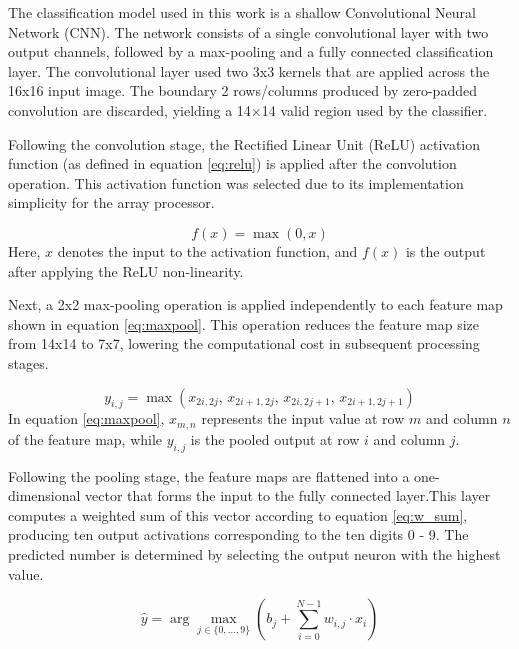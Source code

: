         The classification model used in this work is a shallow Convolutional Neural Network (CNN). The network consists of a single convolutional layer with two output channels, followed by a max-pooling and a fully connected classification layer. The convolutional layer used two 3x3 kernels that are applied across the 16x16 input image. The boundary 2 rows/columns produced by zero-padded convolution are discarded, yielding a 14×14 valid region used by the classifier.
        
        Following the convolution stage, the Rectified Linear Unit (ReLU) activation function (as defined in equation \ref{eq:relu}) is applied after the convolution operation. This activation function was selected due to its implementation simplicity for the array processor.
        
        \begin{equation}
        f(x) = \max(0,x)
        \label{eq:relu}
        \end{equation}
        Here, $x$ denotes the input to the activation function, and $f(x)$ is the output after applying the ReLU non-linearity.
        
        Next, a 2x2 max-pooling operation is applied independently to each feature map shown in equation \ref{eq:maxpool}. This operation reduces the feature map size from 14x14 to 7x7, lowering the computational cost in subsequent processing stages.

        \begin{equation}
        y_{i,j} = \max \left(
        x_{2i,2j},\,
        x_{2i+1,2j},\,
        x_{2i,2j+1},\,
        x_{2i+1,2j+1}
        \right)
        \label{eq:maxpool}
        \end{equation}
        In equation \ref{eq:maxpool}, $x_{m,n}$ represents the input value at row $m$ and column $n$ of the feature map, while $y_{i,j}$ is the pooled output at row $i$ and column $j$.
        
        Following the pooling stage, the feature maps are flattened into a one-dimensional vector that forms the input to the fully connected layer.This layer computes a weighted sum of this vector according to equation \ref{eq:w_sum}, producing ten output activations corresponding to the ten digits 0 - 9. The predicted number is determined by selecting the output neuron with the highest value.

        \begin{equation}
          \hat{y} = \arg\max_{j \in \{0,\ldots,9\}} \left( b_j + \sum_{i=0}^{N-1} w_{i,j} \cdot x_i \right)
          \label{eq:w_sum}
        \end{equation}
        

